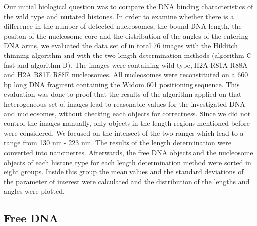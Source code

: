 \documentclass{article}
\begin{document}
Our initial biological question was to compare the DNA binding characteristics of the wild type and mutated histones. In order to examine whether there is a difference in the number of detected nucleosomes, the bound DNA length, the positon of the nucleosome core and the distribution of the angles of the entering DNA arms, we evaluated the data set of in total 76 images with the Hilditch thinning algorithm and with the two length determination methods (algorithm C fast and algorithm D). 
The images were containing wild type, H2A R81A R88A and H2A R81E R88E nucleosomes. All nucleosomes were reconstituted on a 660 bp long DNA fragment containing the Widom 601 positioning sequence. This evaluation was done to proof that the results of the algorithm applied on that heterogeneous set of images lead to reasonable values for the investigated DNA and nucleosomes, without checking each objects for correctness. Since we did not control the images manually, only objects in the length regions mentioned before were considered. We focused on the intersect of the two ranges which lead to a range from 130 nm - 223 nm. The results of the length determination were converted into nanometres. Afterwards, the free DNA objects and the nucleosome objects of each histone type for each length determination method were sorted in eight groups. Inside this group the mean values and the standard deviations of the parameter of interest were calculated and the distribution of the lengths and angles were plotted.


\subsection{Free DNA}\label{sec: Free DNA}
\end{document}
